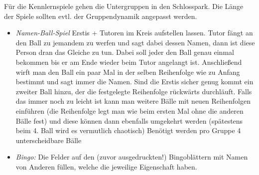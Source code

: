 \documentclass[10pt,twocolumn,ngerman]{scrartcl}
\begin{document}
Für die Kennlernspiele gehen die Untergruppen in den Schlosspark. Die Länge der
Spiele sollten evtl. der Gruppendynamik angepasst werden.
\begin{itemize}
    \item \emph{Namen-Ball-Spiel} Erstis + Tutoren im  Kreis aufstellen lassen.
        Tutor fängt an den Ball zu jemandem zu werfen und sagt dabei dessen
        Namen,  dann ist diese Person dran das Gleiche zu tun. Dabei soll jeder
        den Ball genau einmal bekommen bis er am Ende wieder beim Tutor
        angelangt ist. Anschließend wirft man den Ball ein paar Mal in der
        selben Reihenfolge wie zu Anfang bestimmt und sagt immer die Namen.
        Sind die Erstis sicher genug kommt ein zweiter Ball hinzu,  der die
        festgelegte Reihenfolge rückwärts durchläuft. Falls das immer noch zu
        leicht ist kann man weitere Bälle mit neuen Reihenfolgen einführen (die
        Reihenfolge legt man wie beim ersten Mal ohne die anderen Bälle fest)
        und diese können dann  ebenfalls umgekehrt werden (spätestens beim 4.
        Ball wird es vermutlich chaotisch)
        Benötigt werden  pro Gruppe 4 unterscheidbare Bälle
    \item \emph{Bingo:} Die Felder auf den (zuvor ausgedruckten!) Bingoblättern mit Namen von Anderen füllen, welche die jeweilige Eigenschaft haben.


\end{itemize}
\end{document}

